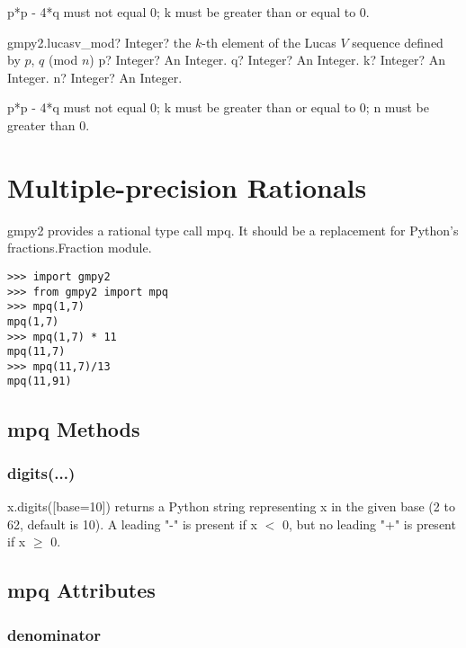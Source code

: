\vspace{0.3cm}
p*p - 4*q must not equal 0; k must be greater than or equal to 0.




\vspace{0.6cm}
\begin{mpFunctionsExtract}
	\mpFunctionFour
	{gmpy2.lucasv\_mod? Integer? the $k$-th element of the Lucas $V$ sequence defined by $p$, $q$ (mod $n$)}
	{p? Integer? An Integer.}
	{q? Integer? An Integer.}
	{k? Integer? An Integer.}
	{n? Integer? An Integer.}
\end{mpFunctionsExtract}

\vspace{0.3cm}
p*p - 4*q must not equal 0; k must be greater than or equal to 0; n must be greater than 0.




\newpage
\section{Multiple-precision Rationals}

gmpy2 provides a rational type call mpq. It should be a replacement for Python's
fractions.Fraction module.

\begin{lstlisting}
>>> import gmpy2
>>> from gmpy2 import mpq
>>> mpq(1,7)
mpq(1,7)
>>> mpq(1,7) * 11
mpq(11,7)
>>> mpq(11,7)/13
mpq(11,91)
\end{lstlisting}


\subsection{mpq Methods}

\subsubsection{digits(...)}

x.digits([base=10]) returns a Python string representing x in the given base (2 to 62, default is 10). A leading "-" is present if x $<$ 0, but no leading "+" is present if x $\ge$ 0.


\subsection{mpq Attributes}

\subsubsection{denominator}

